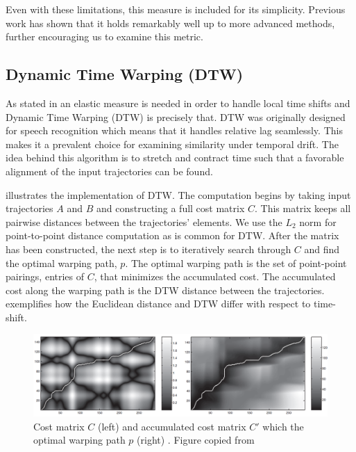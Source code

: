 Even with these limitations, this measure is included for its simplicity.  Previous work has shown that it holds remarkably well up to more advanced methods\cite{26-QueryingMining}, further encouraging us to examine this metric. 


\subsection{Dynamic Time Warping (DTW)}

As stated in  an elastic measure is needed in order to handle local time shifts and Dynamic Time Warping (DTW) is precisely that. 
DTW was originally designed for speech recognition which means that it handles relative lag seamlessly\cite{45-CrosswordsReference, 27-DynamicTime}.
This makes it a prevalent choice for examining similarity under temporal drift.
The idea behind this algorithm is to stretch and contract time such that a favorable alignment of the input trajectories can be found. 


 illustrates the implementation of DTW. 
The computation begins by taking input trajectories $A$ and $B$ and constructing a full cost matrix $C$. This matrix keeps all pairwise distances  between the trajectories' elements. 
We use the $L_2$ norm for point-to-point distance computation as is common for DTW\cite{5-ComputingVisualizing}. 
After the matrix has been constructed, the next step is to iteratively search through  $C$ and find the optimal warping path, $p$. 
The optimal warping path is the set of point-point pairings, entries of $C$, that  minimizes the accumulated cost. 
The accumulated cost along the warping path is the DTW distance between the trajectories. 
 exemplifies how the Euclidean distance and DTW differ with respect to time-shift. 


\begin{figure}[h]
\centering
\includegraphics[width=.7\textwidth]{figs/algos/dtw_C_p.png}
\caption{Cost matrix $C$ (left) and accumulated cost matrix $C'$ which the optimal warping path $p$ (right) . Figure copied from \cite{27-DynamicTime}}
\label{fig:dtw_cost_path}
\end{figure}

